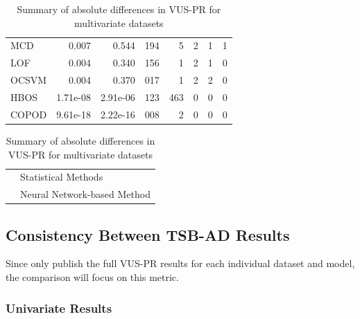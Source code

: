 \documentclass[12pt,oneside]{article}
\begin{document}
\begin{table}[htbp]
\begin{tabular}{lrrrrrrr}
        \rowcolor{lightgray} MCD & 0.007 & 0.544 & 194 & 5 & 2 & 1 & 1 \\
        \rowcolor{lightgray} LOF & 0.004 & 0.340 & 156 & 1 & 2 & 1 & 0 \\
        \rowcolor{lightgray} OCSVM & 0.004 & 0.370 & 017 & 1 & 2 & 2 & 0 \\
        \rowcolor{lightgray} HBOS & 1.71e-08 & 2.91e-06 & 123 & 463 & 0 & 0 & 0 \\
        \rowcolor{lightgray} COPOD & 9.61e-18 & 2.22e-16 & 008 & 2 & 0 & 0 & 0 \\
        \bottomrule
    \end{tabular}
    \par
    \vspace{1em}
    \noindent
    \begin{tabular}{@{} p{1em} l @{}}
        \rowcolor{lightgray} \strut & Statistical Methods \\
        \rowcolor{myLightBlue} \strut & Neural Network-based Method \\
    \end{tabular}
    \caption{\label{tab:Table 3} Summary of absolute differences in VUS-PR for multivariate datasets}
\end{table}

\subsection{Consistency Between TSB-AD Results}

Since \cite{liu2024elephant} only publish the full VUS-PR results for each individual dataset and model, the comparison will focus on this metric.

\subsubsection{Univariate Results}
\end{document}
